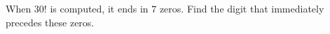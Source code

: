 When $30!$ is computed, it ends in $7$ zeros. Find the digit that immediately precedes these zeros.
